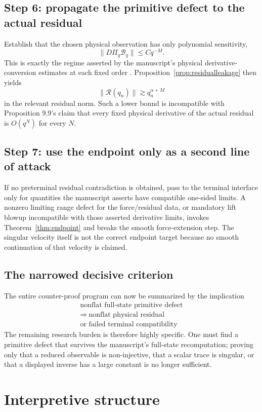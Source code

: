 \documentclass[12pt]{article}
\newcommand{\Rres}{\mathcal R}
\begin{document}
\subsection{Step 6: propagate the primitive defect to the actual residual}
Establish that the chosen physical observation has only polynomial sensitivity,
\[
\|D\Pi_q\mathcal B_q\|\le Cq^{-M}.
\]
This is exactly the regime asserted by the manuscript's physical derivative-conversion estimates at each fixed order \cite[Lemma 9.8]{OpenAI2026}. Proposition~\ref{prop:residualleakage} then yields
\[
\|\Rres(q_n)\|
\gtrsim q_n^{\alpha+M}
\]
in the relevant residual norm. Such a lower bound is incompatible with Proposition 9.9's claim that every fixed physical derivative of the actual residual is $O(q^N)$ for every $N$.

\subsection{Step 7: use the endpoint only as a second line of attack}
If no preterminal residual contradiction is obtained, pass to the terminal interface only for quantities the manuscript asserts have compatible one-sided limits. A nonzero limiting range defect for the force/residual data, or mandatory lift blowup incompatible with those asserted derivative limits, invokes Theorem~\ref{thm:endpoint} and breaks the smooth force-extension step. The singular velocity itself is not the correct endpoint target because no smooth continuation of that velocity is claimed.

\subsection{The narrowed decisive criterion}
The entire counter-proof program can now be summarized by the implication
\[
\boxed{\begin{gathered}
\text{nonflat full-state primitive defect}\\
\Longrightarrow\ \text{nonflat physical residual}\\
\text{or failed terminal compatibility}
\end{gathered}}
\]
The remaining research burden is therefore highly specific. One must find a primitive defect that survives the manuscript's full-state recomputation; proving only that a reduced observable is non-injective, that a scalar trace is singular, or that a displayed inverse has a large constant is no longer sufficient.

\section{Interpretive structure}
\end{document}
